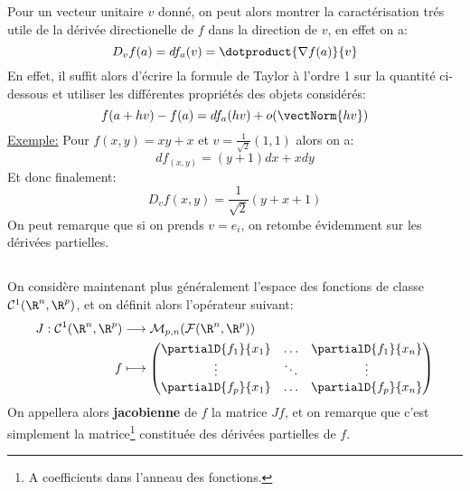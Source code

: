 \subsection*{}
Pour un vecteur unitaire \(v\) donné, on peut alors montrer la caractérisation trés utile de la dérivée directionelle de \(f\) dans la direction de \(v\), en effet on a:
\[
   D_vf(a) = df_a(v) = \dotproduct{\nabla f(a)}{v}  
\]
En effet, il suffit alors d'écrire la formule de Taylor à l'ordre 1 sur la quantité ci-dessous et utiliser les différentes propriétés des objets considérés:
\[
   f(a + hv) - f(a) = df_a(hv) + o(\vectNorm{hv})
\]
\uline{Exemple:} Pour \(f(x,y) = xy + x\) et  \(v = \frac{1}{\sqrt{2}}(1, 1)\) alors on a:
\[
   df_{(x, y)} = (y+1)dx + xdy   
\]
Et donc finalement:
\[
   D_vf(x, y) = \frac{1}{\sqrt{2}}(y + x + 1)
\]
On peut remarque que si on prends \(v = e_i\), on retombe évidemment sur les dérivées partielles.
\pagebreak

\subsection*{}
On considère maintenant plus généralement l'espace des fonctions de classe \(\mathcal{C}^1(\R^n, \R^p)\), et on définit alors l'opérateur suivant:
\[
   \begin{aligned}
      J : \mathcal{C}^1(\R^n, \R^p) &\longrightarrow \mathcal{M}_{p, n}(\mathcal{F}(\R^n, \R^p))\\
      f &\longmapsto \begin{pmatrix}
         \partialD{f_1}{x_1} &\ldots &\partialD{f_1}{x_n}\\
         \vdots &\ddots &\vdots \\ 
         \partialD{f_p}{x_1} &\ldots &\partialD{f_p}{x_n}
      \end{pmatrix}
   \end{aligned}
\]
On appellera alors \textbf{jacobienne} de \(f\) la matrice \(Jf\), et on remarque que c'est simplement la matrice\footnote[1]{A coefficients dans l'anneau des fonctions.} constituée des dérivées partielles de \(f\).\<

